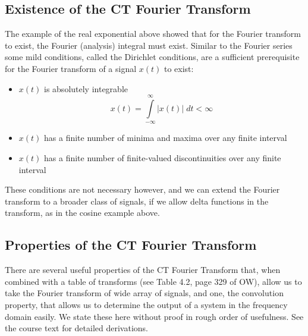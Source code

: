 \subsection{Existence of the CT Fourier Transform}

The example of the real exponential above showed that for the Fourier transform to exist, the Fourier (analysis) integral must exist. Similar to the Fourier series some mild conditions, called the Dirichlet conditions, are a sufficient prerequisite for the Fourier transform of a signal $x(t)$ to exist:
\begin{itemize}
\item $x(t)$ is absolutely integrable
  \[
  x(t) = \int\limits_{-\infty}^{\infty} |x(t)|\; dt < \infty
  \]
\item $x(t)$ has a finite number of minima and maxima over any finite interval
\item $x(t)$ has a finite number of finite-valued discontinuities over any finite interval
\end{itemize}

These conditions are not necessary however, and we can extend the Fourier transform to a broader class of signals, if we allow delta functions in the transform, as in the cosine example above. 

\subsection{Properties of the CT Fourier Transform}

There are several useful properties of the CT Fourier Transform that, when combined with a table of transforms (see Table 4.2, page 329 of OW), allow us to take the Fourier transform of  wide array of signals, and one, the convolution property, that allows us to determine the output of a system in the frequency domain easily. We state these here without proof in rough order of usefulness. See the course text for detailed derivations.

